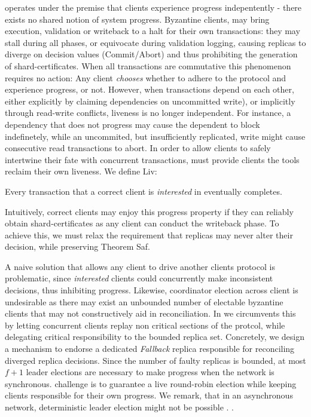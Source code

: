 \sys operates under the premise that clients experience progress indepentently - there exists no shared notion of system progress. Byzantine clients, may bring execution, validation or writeback to a halt for their own transactions: they may stall during all phases, or equivocate during validation logging, causing replicas to diverge on decision values (Commit/Abort) and thus prohibiting the generation of shard-certificates. When all transactions are commutative this phenomenon requires no action: Any client \textit{chooses} whether to adhere to the protocol and experience progress, or not. However, when transactions depend on each other, either explicitly by claiming dependencies on uncommitted write), or implicitly through read-write conflicts, liveness is no longer independent. For instance, a dependency that does not progress may cause the dependent to block indefinetely, while an uncommited, but insufficiently replicated, write might cause consecutive read transactions to abort.
In order to allow clients to safely intertwine their fate with concurrent transactions, \sys must provide clients the tools reclaim their own liveness. We define Liv: 
\begin{theorem}[Liv] 
Every transaction that a correct client is \textit{interested} in eventually completes.
\end{theorem}

Intuitively, correct clients may enjoy this progress property if they can reliably obtain shard-certificates as any client can conduct the writeback phase. To achieve this, we must relax the requirement that replicas may never alter their decision, while preserving Theorem Saf.

A naive solution that allows any client to drive another clients protocol is problematic, since \textit{interested} clients could concurrently make inconsistent decisions, thus inhibiting progress. Likewise, coordinator election across client is undesirable as there may exist an unbounded number of electable byzantine clients that may not constructively aid in reconciliation. In \sys we circumvents this by letting concurrent clients replay non critical sections of the protcol, while delegating critical responsibility to the bounded replica set. Concretely, we design a mechanism to endorse a dedicated \textit{Fallback} replica responsible for reconciling diverged replica decisions. Since the number of faulty replicas is bounded, at most $f+1$ leader elections are necessary to make progress when the network is synchronous. \sys challenge is to guarantee a live round-robin election while keeping clients responsible for their own progress. We remark, that in an asynchronous network, deterministic leader election might not be possible  \cite{fischer1985impossibility}.  .

